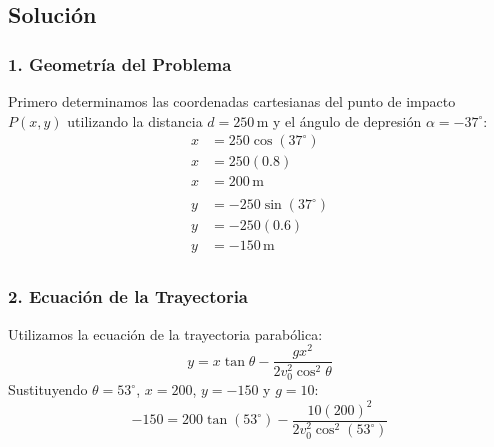 \documentclass[12pt, a4paper]{article}
\begin{document}
\begin{center}
\end{center}

\subsection*{Solución}

\subsubsection*{1. Geometría del Problema}
Primero determinamos las coordenadas cartesianas del punto de impacto $P(x, y)$ utilizando la distancia $d=250\,\text{m}$ y el ángulo de depresión $\alpha = -37^\circ$:
\begin{align*}
    x &= 250 \cos(37^\circ) \\
    x &= 250(0.8) \\
    x &= 200\,\text{m} \\
      \\
    y &= -250 \sin(37^\circ) \\
    y &= -250(0.6) \\
    y &= -150\,\text{m}\\
\end{align*}

\subsubsection*{2. Ecuación de la Trayectoria}
Utilizamos la ecuación de la trayectoria parabólica:
$$ y = x \tan\theta - \frac{g x^2}{2 v_0^2 \cos^2\theta} $$
Sustituyendo $\theta = 53^\circ$, $x=200$, $y=-150$ y $g=10$:
$$ -150 = 200 \tan(53^\circ) - \frac{10(200)^2}{2 v_0^2 \cos^2(53^\circ)} $$
\end{document}
